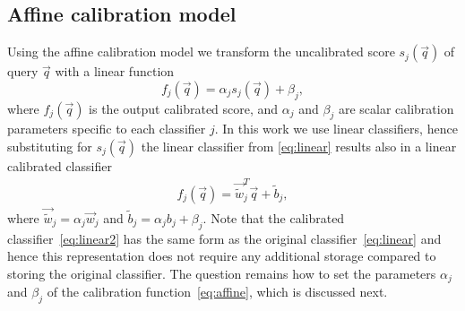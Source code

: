   \subsection{Affine calibration model}
    Using the affine calibration model we transform the uncalibrated score $s_j(\vec{q})$ of query $\vec{q}$ with a linear function 
      \begin{equation}
       f_j(\vec{q}) = \alpha_j s_j(\vec{q}) + \beta_j,
       \label{eq:affine}
      \end{equation}
    where 
    $ f_j(\vec{q})$ is the output calibrated score, and
    $\alpha_j$ and $\beta_j$ are scalar calibration parameters specific to each classifier $j$.
    In this work we use linear classifiers, hence substituting for $s_j(\vec{q})$ %
    the linear classifier from \eqref{eq:linear} results also in a linear calibrated classifier
      \begin{align}
      \label{eq:linear2}
          f_j(\vec{q}) = \vec{\widetilde{w}}_j^T \vec{q} + \widetilde{b}_j,
       \end{align}
  where $\vec{\widetilde{w}}_j = \alpha_j\vec{w}_j$ and $\widetilde{b}_j=\alpha_j b_j+\beta_j$. 
  Note that the calibrated classifier~\eqref{eq:linear2} has the same form as the original classifier~\eqref{eq:linear} and hence this representation does not require any additional storage compared to storing the original classifier. The question remains how to set the parameters $\alpha_j$ and $\beta_j$ of the calibration function~\eqref{eq:affine}, which is discussed next.


